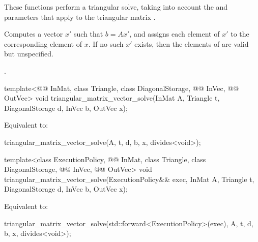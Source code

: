 \begin{itemdescr}

\pnum
These functions perform
a triangular solve,
taking into account the  and  parameters
that apply to the triangular matrix .

\pnum
\effects
Computes a vector $x'$ such that $b = A x'$,
and assigns each element of $x'$ to the corresponding element of $x$.
If no such $x'$ exists,
then the elements of  are valid but unspecified.

\pnum
\complexity
{}.
\end{itemdescr}

%
\begin{itemdecl}
template<@@ InMat, class Triangle, class DiagonalStorage,
         @@ InVec, @@ OutVec>
  void triangular_matrix_vector_solve(InMat A, Triangle t, DiagonalStorage d, InVec b, OutVec x);
\end{itemdecl}

\begin{itemdescr}
\pnum
\effects
Equivalent to:
\begin{codeblock}
triangular_matrix_vector_solve(A, t, d, b, x, divides<void>{});
\end{codeblock}
\end{itemdescr}

%
\begin{itemdecl}
template<class ExecutionPolicy, @@ InMat, class Triangle, class DiagonalStorage,
         @@ InVec, @@ OutVec>
  void triangular_matrix_vector_solve(ExecutionPolicy&& exec,
                                      InMat A, Triangle t, DiagonalStorage d, InVec b, OutVec x);
\end{itemdecl}

\begin{itemdescr}
\pnum
\effects
Equivalent to:
\begin{codeblock}
triangular_matrix_vector_solve(std::forward<ExecutionPolicy>(exec),
                               A, t, d, b, x, divides<void>{});
\end{codeblock}
\end{itemdescr}

